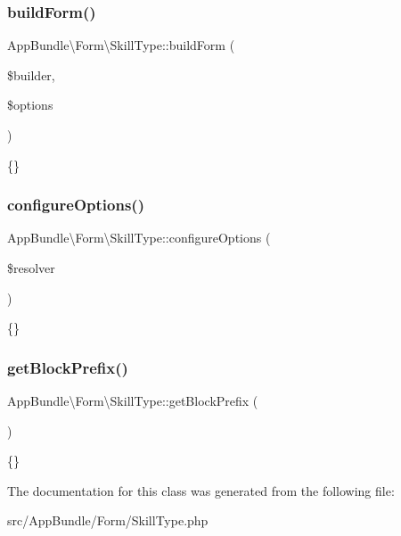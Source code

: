 \subsubsection{\texorpdfstring{build\+Form()}{buildForm()}}
{\footnotesize\ttfamily App\+Bundle\textbackslash{}\+Form\textbackslash{}\+Skill\+Type\+::build\+Form (\begin{DoxyParamCaption}\item[{Form\+Builder\+Interface}]{\$builder,  }\item[{array}]{\$options }\end{DoxyParamCaption})}

\{\} \mbox{\label{class_app_bundle_1_1_form_1_1_skill_type_aaebaf3b685fa968a94a4cd89fca72a9f}} 
\subsubsection{\texorpdfstring{configure\+Options()}{configureOptions()}}
{\footnotesize\ttfamily App\+Bundle\textbackslash{}\+Form\textbackslash{}\+Skill\+Type\+::configure\+Options (\begin{DoxyParamCaption}\item[{Options\+Resolver}]{\$resolver }\end{DoxyParamCaption})}

\{\} \mbox{\label{class_app_bundle_1_1_form_1_1_skill_type_a40d9ea856188ed3c84fb1453d9b521f3}} 
\subsubsection{\texorpdfstring{get\+Block\+Prefix()}{getBlockPrefix()}}
{\footnotesize\ttfamily App\+Bundle\textbackslash{}\+Form\textbackslash{}\+Skill\+Type\+::get\+Block\+Prefix (\begin{DoxyParamCaption}{ }\end{DoxyParamCaption})}

\{\} 

The documentation for this class was generated from the following file\+:\begin{DoxyCompactItemize}
\item 
src/\+App\+Bundle/\+Form/Skill\+Type.\+php\end{DoxyCompactItemize}
